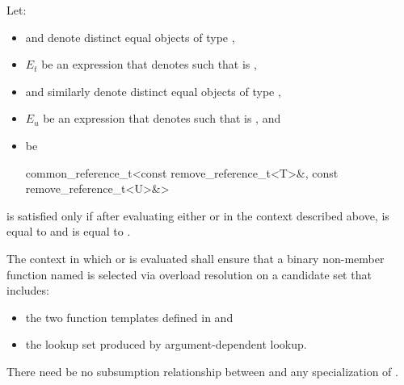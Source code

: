 \begin{itemdescr}
\pnum
Let:
\begin{itemize}
\item {} and  denote distinct equal objects of type
  ,
\item $E_t$ be an expression that denotes  such that
   is ,
\item {} and  similarly denote distinct equal objects of type
  ,
\item $E_u$ be an expression that denotes  such that
   is , and
\item {} be
  \begin{codeblock}
    common_reference_t<const remove_reference_t<T>&, const remove_reference_t<U>&>
  \end{codeblock}
\end{itemize}
 is satisfied only if after evaluating
either  or  in the context
described above,  is equal to  and  is
equal to .

\pnum
The context in which  or 
is evaluated shall ensure that a binary non-member function named  is
selected via overload resolution on a candidate set that
includes:
\begin{itemize}
\item the two  function templates defined in
   and
\item the lookup set produced by argument-dependent
  lookup.
\end{itemize}

\pnum
There need be no subsumption relationship between
and any specialization of
.
\end{itemdescr}


